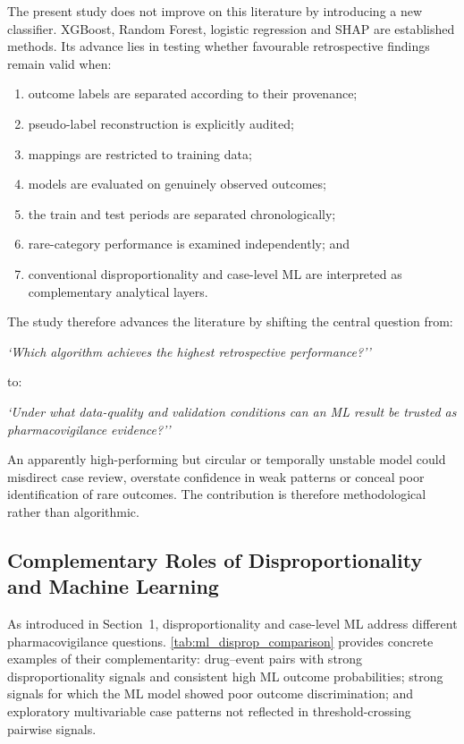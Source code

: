 \documentclass[10pt]{article}
\begin{document}
The present study does not improve on this literature by introducing a new classifier. XGBoost, Random Forest, logistic regression and SHAP are established methods. Its advance lies in testing whether favourable retrospective findings remain valid when:
\begin{enumerate}
\item outcome labels are separated according to their provenance;
\item pseudo-label reconstruction is explicitly audited;
\item mappings are restricted to training data;
\item models are evaluated on genuinely observed outcomes;
\item the train and test periods are separated chronologically;
\item rare-category performance is examined independently; and
\item conventional disproportionality and case-level ML are interpreted as complementary analytical layers.
\end{enumerate}

The study therefore advances the literature by shifting the central question from:

\emph{`Which algorithm achieves the highest retrospective performance?''}

to:

\emph{`Under what data-quality and validation conditions can an ML result be trusted as pharmacovigilance evidence?''}

An apparently high-performing but circular or temporally unstable model could misdirect case review, overstate confidence in weak patterns or conceal poor identification of rare outcomes. The contribution is therefore methodological rather than algorithmic.

\subsection{Complementary Roles of Disproportionality and Machine Learning}
As introduced in Section~1, disproportionality and case-level ML address different pharmacovigilance questions. \cref{tab:ml_disprop_comparison} provides concrete examples of their complementarity: drug--event pairs with strong disproportionality signals and consistent high ML outcome probabilities; strong signals for which the ML model showed poor outcome discrimination; and exploratory multivariable case patterns not reflected in threshold-crossing pairwise signals.
\end{document}
